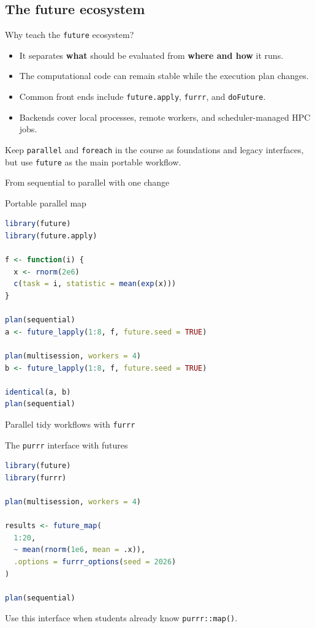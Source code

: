 \subsection{The future ecosystem}

\begin{frame}{Why teach the \texttt{future} ecosystem?}
\begin{itemize}
  \item It separates \textbf{what} should be evaluated from \textbf{where and how} it runs.
  \item The computational code can remain stable while the execution plan changes.
  \item Common front ends include \texttt{future.apply}, \texttt{furrr}, and \texttt{doFuture}.
  \item Backends cover local processes, remote workers, and scheduler-managed HPC jobs.
\end{itemize}
\vspace{0.2cm}
Keep \texttt{parallel} and \texttt{foreach} in the course as foundations and legacy interfaces, but use \texttt{future} as the main portable workflow.
\end{frame}

\begin{frame}[fragile]{From sequential to parallel with one change}
\begin{block}{Portable parallel map}
\begin{lstlisting}[language=R]
library(future)
library(future.apply)

f <- function(i) {
  x <- rnorm(2e6)
  c(task = i, statistic = mean(exp(x)))
}

plan(sequential)
a <- future_lapply(1:8, f, future.seed = TRUE)

plan(multisession, workers = 4)
b <- future_lapply(1:8, f, future.seed = TRUE)

identical(a, b)
plan(sequential)
\end{lstlisting}
\end{block}
\end{frame}

\begin{frame}[fragile]{Parallel tidy workflows with \texttt{furrr}}
\begin{block}{The \texttt{purrr} interface with futures}
\begin{lstlisting}[language=R]
library(future)
library(furrr)

plan(multisession, workers = 4)

results <- future_map(
  1:20,
  ~ mean(rnorm(1e6, mean = .x)),
  .options = furrr_options(seed = 2026)
)

plan(sequential)
\end{lstlisting}
\end{block}
Use this interface when students already know \texttt{purrr::map()}.
\end{frame}

